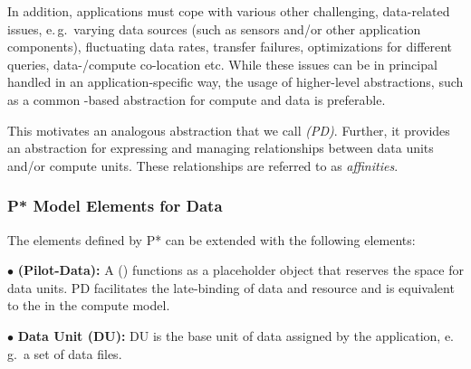 \documentclass[conference]{IEEEtran}
\begin{document}
In addition, applications must cope with various other challenging,
data-related issues, e.\,g.\ varying data sources (such as sensors
and/or other application components), fluctuating data rates, transfer
failures, optimizations for different queries, data-/compute
co-location etc. While these issues can be in principal handled in an
application-specific way, the usage of higher-level abstractions, such
as a common \pilot-based abstraction for compute and data is
preferable.  


This motivates an analogous abstraction that we call \emph{\pilotdata
  (PD)}.  Further, it provides an abstraction for expressing and
managing relationships between data units and/or compute units. These
relationships are referred to as \emph{affinities}.


\subsubsection*{P* Model Elements for Data}


The elements defined by P* can be extended with the following elements:


\noindent$\bullet$
  \textbf{\pilot (Pilot-Data):} A \pilotdata (\pd) functions as a 
	placeholder object that reserves the space
	for data units. PD facilitates the late-binding of data and resource and is
	equivalent to the \pilot in the compute model.

\noindent$\bullet$
  \textbf{Data Unit (DU):} DU is the base unit of data assigned by
  the application,  e.\,g.\ a set of data files. 

\end{document}

